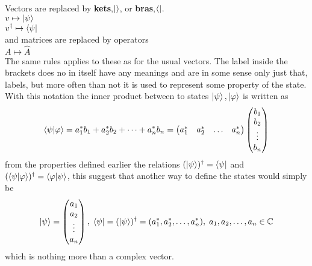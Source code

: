 Vectors are replaced by \textbf{kets},$\ket{}$, or \textbf{bras},$\bra{}$. \\
$v \mapsto \ket{\psi}$ \\
$v^\dagger \mapsto \bra{\psi}$\\
and matrices are replaced by operators\\
$A \mapsto \hat{A}$\\
The same rules applies to these as for the usual vectors.
The label inside the brackets does no in itself have any meanings and are in some sense only just that, labels, but more often than not it is used to represent some property of the state. With this notation the inner product between to states $\ket{\psi},\ket{\varphi}$ is written as 
\begin{equation}
\bra{\psi}\ket{\varphi} = a_1^{*}b_1 + a_2^{*}b_2 + \dots + a_n^{*}b_n = \begin{pmatrix} a_1^{*} & a_2^{*} & \dots & a_n^{*}\end{pmatrix} \begin{pmatrix} b_1 \\ b_2 \\ \vdots \\ b_n\end{pmatrix}
\end{equation}
from the properties defined earlier the relations $(\ket{\psi})^\dagger = \bra{\psi}$ and $ (\bra{\psi}\ket{\varphi})^\dagger = \bra{\varphi}\ket{\psi}$,
this suggest that another way to define the states would simply be
\begin{equation}
\ket{\psi} = \begin{pmatrix}
a_1 \\ a_2 \\ \vdots \\ a_n
\end{pmatrix},\;
\bra{\psi} = (\ket{\psi})^{\dagger} = (a_1^{*}, a_2^{*}, \dots, a_n^{*}),\; a_1,a_2,\dots,a_n \in \mathbb{C}
\end{equation}
which is nothing more than a complex vector.



